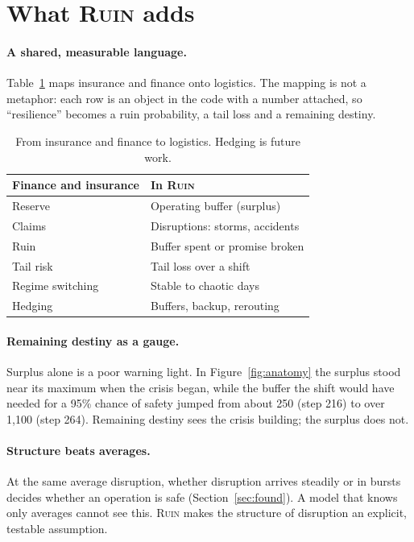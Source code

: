 \documentclass[10pt,twocolumn,a4paper]{article}
\newcommand{\ruin}{\textsc{Ruin}}
\begin{document}
\section{What \ruin{} adds}
\paragraph{A shared, measurable language.} Table~\ref{tab:translate} maps insurance and finance onto logistics. The mapping is not a metaphor: each row is an object in the code with a number attached, so ``resilience'' becomes a ruin probability, a tail loss and a remaining destiny.

\begin{table}[t]
\centering\small
\caption{From insurance and finance to logistics. Hedging is future work.}
\label{tab:translate}
\renewcommand{\arraystretch}{1.08}
\begin{tabular}{@{}ll@{}}
\toprule
Finance and insurance & In \ruin \\
\midrule
Reserve & Operating buffer (surplus) \\
Claims & Disruptions: storms, accidents \\
Ruin & Buffer spent or promise broken \\
Tail risk \cite{mcneil2015,rockafellar2000} & Tail loss over a shift \\
Regime switching \cite{hamilton1989} & Stable to chaotic days \\
Hedging & Buffers, backup, rerouting \\
\bottomrule
\end{tabular}
\end{table}

\paragraph{Remaining destiny as a gauge.} Surplus alone is a poor warning light. In Figure~\ref{fig:anatomy} the surplus stood near its maximum when the crisis began, while the buffer the shift would have needed for a 95\% chance of safety jumped from about 250 (step 216) to over 1,100 (step 264). Remaining destiny sees the crisis building; the surplus does not.

\paragraph{Structure beats averages.} At the same average disruption, whether disruption arrives steadily or in bursts decides whether an operation is safe (Section~\ref{sec:found}). A model that knows only averages cannot see this. \ruin{} makes the structure of disruption an explicit, testable assumption.
\end{document}
